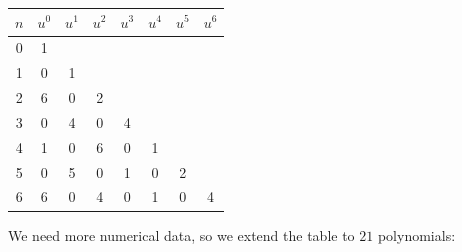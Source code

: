 \documentclass[12pt, letterpaper]{article} %
\begin{document}
\begin{center}
  \begin{tabular}{|c|c|c|c|c|c|c|c|}
   \hline
   \multicolumn{1}{|l|}{$n$} & \multicolumn{1}{l|}{$u^0$} & \multicolumn{1}{l|}{$u^1$} & \multicolumn{1}{l|}{$u^2$} & \multicolumn{1}{l|}{$u^3$} & \multicolumn{1}{l|}{$u^4$} & \multicolumn{1}{l|}{$u^5$} & \multicolumn{1}{l|}{$u^6$} \\ \hline
   0                         & 1                          &                            &                            &                            &                            &                            &                            \\ \hline
   1                         & 0                          & 1                          &                            &                            &                            &                            &                            \\ \hline
   2                         & 6                          & 0                          & 2                          &                            &                            &                            &                            \\ \hline
   3                         & 0                          & 4                          & 0                          & 4                          &                            &                            &                            \\ \hline
   4                         & 1                          & 0                          & 6                          & 0                          & 1                          &                            &                            \\ \hline
   5                         & 0                          & 5                          & 0                          & 1                          & 0                          & 2                          &                            \\ \hline
   6                         & 6                          & 0                          & 4                          & 0                          & 1                          & 0                          & 4                          \\ \hline
  \end{tabular}
  \end{center}

We need more numerical data, so we extend the table to $21$ polynomials:
\end{document}
